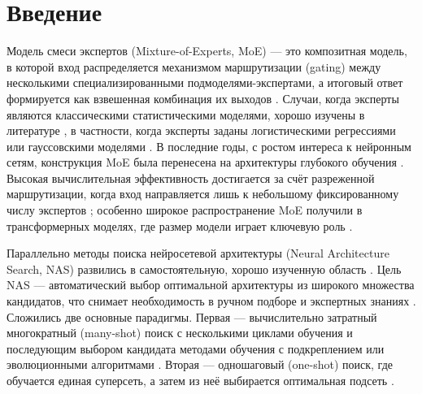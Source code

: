 \chapter*{Введение}							%
\label{intro}

Модель смеси экспертов (Mixture-of-Experts, MoE) --- это композитная
модель, в которой вход распределяется механизмом маршрутизации
(gating) между несколькими специализированными подмоделями-экспертами,
а итоговый ответ формируется как взвешенная комбинация их выходов
\cite{jacobs1991adaptive, jordan1994hierarchical, jacobs1997bayesian}.
Случаи, когда эксперты являются классическими статистическими моделями,
хорошо изучены в литературе \cite{piwko2025divide}, в частности, когда
эксперты заданы логистическими регрессиями \cite{nguyen2023general} или
гауссовскими моделями \cite{nguyen2023demystifying, rasmussen2001infinite}.
В последние годы, с ростом интереса к нейронным сетям, конструкция MoE
была перенесена на архитектуры глубокого обучения \cite{eigen2013learning}.
Высокая вычислительная эффективность достигается за счёт разреженной
маршрутизации, когда вход направляется лишь к небольшому фиксированному
числу экспертов \cite{shazeer2017outrageously, riquelme2021scaling, fedus2022switch};
особенно широкое распространение MoE получили в трансформерных моделях,
где размер модели играет ключевую роль
\cite{jiang2024mixtral, qiu2025demons, dai2024deepseekmoe, mu2025comprehensive}.

Параллельно методы поиска нейросетевой архитектуры (Neural Architecture
Search, NAS) развились в самостоятельную, хорошо изученную область
\cite{ren2021comprehensive, nayman2019xnas, zoph2018learning}. Цель NAS ---
автоматический выбор оптимальной архитектуры из широкого множества
кандидатов, что снимает необходимость в ручном подборе и экспертных
знаниях \cite{liu2018darts}. Сложились две основные парадигмы. Первая ---
вычислительно затратный многократный (many-shot) поиск с несколькими
циклами обучения и последующим выбором кандидата методами обучения с
подкреплением \cite{zoph2016neural, baker2016designing} или
эволюционными алгоритмами \cite{real2019regularized, yang2020cars}.
Вторая --- одношаговый (one-shot) поиск, где обучается единая
суперсеть, а затем из неё выбирается оптимальная подсеть
\cite{liu2018darts, chen2020stabilizing, you2020greedynas}.

